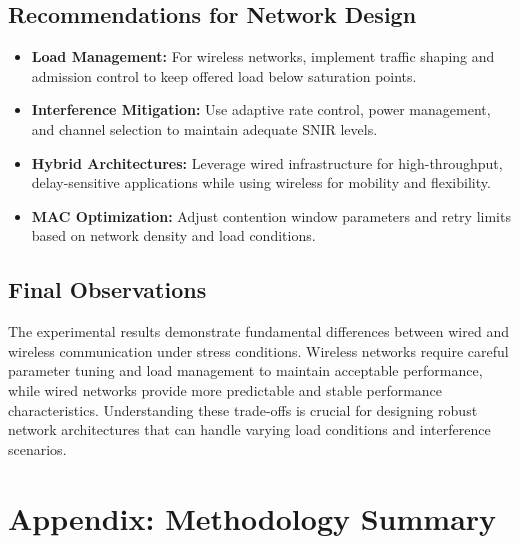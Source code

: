 \documentclass{article}
\begin{document}
\subsection{Recommendations for Network Design}

\begin{itemize}

  \item \textbf{Load Management:} For wireless networks, implement traffic shaping and admission control to keep offered load below saturation points.

  

  \item \textbf{Interference Mitigation:} Use adaptive rate control, power management, and channel selection to maintain adequate SNIR levels.

  

  \item \textbf{Hybrid Architectures:} Leverage wired infrastructure for high-throughput, delay-sensitive applications while using wireless for mobility and flexibility.

  

  \item \textbf{MAC Optimization:} Adjust contention window parameters and retry limits based on network density and load conditions.

\end{itemize}

\subsection{Final Observations}

The experimental results demonstrate fundamental differences between wired and wireless communication under stress conditions. Wireless networks require careful parameter tuning and load management to maintain acceptable performance, while wired networks provide more predictable and stable performance characteristics. Understanding these trade-offs is crucial for designing robust network architectures that can handle varying load conditions and interference scenarios.

\section*{Appendix: Methodology Summary}
\end{document}
